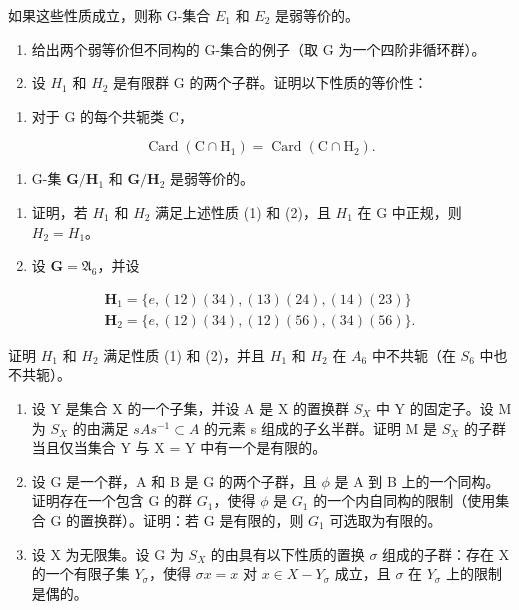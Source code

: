 如果这些性质成立，则称 G-集合 \(E_{1}\) 和 \(E_{2}\) 是弱等价的。

\begin{enumerate}
\def\labelenumi{(\alph{enumi})}
\setcounter{enumi}{1}
\item
  给出两个弱等价但不同构的 G-集合的例子（取 G 为一个四阶非循环群）。
\item
  设 \(H_{1}\) 和 \(H_{2}\) 是有限群 G 的两个子群。证明以下性质的等价性：
\end{enumerate}

\begin{enumerate}
\def\labelenumi{(\arabic{enumi})}
\tightlist
\item
  对于 G 的每个共轭类 C，
\end{enumerate}

\[
\operatorname{Card} (\mathrm{C} \cap \mathrm{H} _ {1}) = \operatorname{Card} (\mathrm{C} \cap \mathrm{H} _ {2}).
\]

\begin{enumerate}
\def\labelenumi{(\arabic{enumi})}
\setcounter{enumi}{1}
\tightlist
\item
  G-集 \(\mathbf{G} / \mathbf{H}_1\) 和 \(\mathbf{G} / \mathbf{H}_2\) 是弱等价的。
\end{enumerate}

\begin{enumerate}
\def\labelenumi{(\alph{enumi})}
\setcounter{enumi}{3}
\item
  证明，若 \(H_{1}\) 和 \(H_{2}\) 满足上述性质 (1) 和 (2)，且 \(H_{1}\) 在 G 中正规，则 \(H_{2} = H_{1}\)。
\item
  设 \(\mathbf{G} = \mathfrak{A}_6\)，并设
\end{enumerate}

\[
\begin{array}{l} \mathbf {H} _ {1} = \{e, (1 2) (3 4), (1 3) (2 4), (1 4) (2 3) \} \\ \mathbf {H} _ {2} = \{e, (1 2) (3 4), (1 2) (5 6), (3 4) (5 6) \}. \end{array}
\]

证明 \(H_{1}\) 和 \(H_{2}\) 满足性质 (1) 和 (2)，并且 \(H_{1}\) 和 \(H_{2}\) 在 \(A_{6}\) 中不共轭（在 \(S_{6}\) 中也不共轭）。

\begin{enumerate}
\def\labelenumi{\arabic{enumi}。}
\setcounter{enumi}{26}
\item
  设 Y 是集合 X 的一个子集，并设 A 是 X 的置换群 \(S_{X}\) 中 Y 的固定子。设 M 为 \(S_{X}\) 的由满足 \(sAs^{-1} \subset A\) 的元素 s 组成的子幺半群。证明 M 是 \(S_{X}\) 的子群当且仅当集合 Y 与 X = Y 中有一个是有限的。
\item
  设 G 是一个群，A 和 B 是 G 的两个子群，且 \(\phi\) 是 A 到 B 上的一个同构。证明存在一个包含 G 的群 \(G_{1}\)，使得 \(\phi\) 是 \(G_{1}\) 的一个内自同构的限制（使用集合 G 的置换群）。证明：若 G 是有限的，则 \(G_{1}\) 可选取为有限的。
\item
  设 X 为无限集。设 G 为 \(S_{X}\) 的由具有以下性质的置换 \(\sigma\) 组成的子群：存在 X 的一个有限子集 \(Y_{\sigma}\)，使得 \(\sigma x = x\) 对 \(x \in X - Y_{\sigma}\) 成立，且 \(\sigma\) 在 \(Y_{\sigma}\) 上的限制是偶的。
\end{enumerate}

